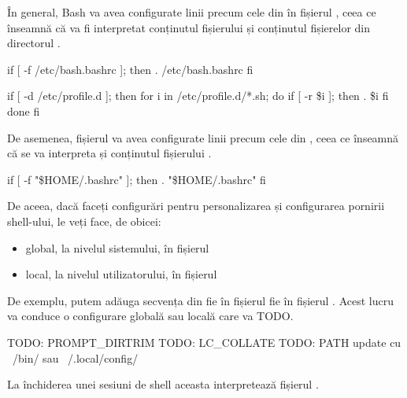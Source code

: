 În general, Bash va avea configurate linii precum cele din  în fișierul
, ceea ce înseamnă că va fi interpretat conținutul fișierului
 și conținutul fișierelor din directorul .

\begin{screen}[caption={Secvență de configurare Bash (/etc/profile)},label={lst:cli:etc-profile}]
        if [ -f /etc/bash.bashrc ]; then
            . /etc/bash.bashrc
        fi


if [ -d /etc/profile.d ]; then
    for i in /etc/profile.d/*.sh; do
        if [ -r \$i ]; then
            . \$i
        fi
    done
fi
\end{screen}

De asemenea, fișierul  va avea configurate linii precum cele din , ceea ce înseamnă că se va interpreta și conținutul fișierului .

\begin{screen}[caption={Secvență de configurare Bash (~/.bashrc)},label={lst:cli:home-profile}]
    if [ -f "\$HOME/.bashrc" ]; then
        . "\$HOME/.bashrc"
    fi
\end{screen}

De aceea, dacă faceți configurări pentru personalizarea și configurarea pornirii
shell-ului, le veți face, de obicei:

\begin{itemize}
  \item global, la nivelul sistemului, în fișierul 
  \item local, la nivelul utilizatorului, în fișierul 
\end{itemize}

De exemplu, putem adăuga secvența din  fie în fișierul  fie în fișierul . Acest lucru va conduce o configurare globală sau locală care va TODO.

\begin{screen}[caption={Configurare în Bash (bashrc)},label={lst:cli:config-bashrc}]
TODO: PROMPT_DIRTRIM
TODO: LC_COLLATE
TODO: PATH update cu ~/bin/ sau ~/.local/config/
\end{screen}

La închiderea unei sesiuni de shell aceasta interpretează fișierul .

